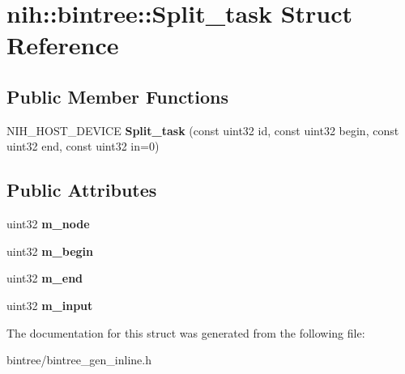 \hypertarget{structnih_1_1bintree_1_1_split__task}{
\section{nih\-:\-:bintree\-:\-:\-Split\-\_\-task \-Struct \-Reference}
\label{structnih_1_1bintree_1_1_split__task}
}
\subsection*{\-Public \-Member \-Functions}
\begin{DoxyCompactItemize}
\item 
\hypertarget{structnih_1_1bintree_1_1_split__task_a6b8703608b459fcbc0af077901c25b6a}{
\-N\-I\-H\-\_\-\-H\-O\-S\-T\-\_\-\-D\-E\-V\-I\-C\-E {\bfseries \-Split\-\_\-task} (const uint32 id, const uint32 begin, const uint32 end, const uint32 in=0)}
\label{structnih_1_1bintree_1_1_split__task_a6b8703608b459fcbc0af077901c25b6a}

\end{DoxyCompactItemize}
\subsection*{\-Public \-Attributes}
\begin{DoxyCompactItemize}
\item 
\hypertarget{structnih_1_1bintree_1_1_split__task_aee4a7c2251650f82d4c9492012c41477}{
uint32 {\bfseries m\-\_\-node}}
\label{structnih_1_1bintree_1_1_split__task_aee4a7c2251650f82d4c9492012c41477}

\item 
\hypertarget{structnih_1_1bintree_1_1_split__task_afa16e63fc29dabf61b3cb6e53fa4a000}{
uint32 {\bfseries m\-\_\-begin}}
\label{structnih_1_1bintree_1_1_split__task_afa16e63fc29dabf61b3cb6e53fa4a000}

\item 
\hypertarget{structnih_1_1bintree_1_1_split__task_aa8a14d7476151677f01ec3703d1862bc}{
uint32 {\bfseries m\-\_\-end}}
\label{structnih_1_1bintree_1_1_split__task_aa8a14d7476151677f01ec3703d1862bc}

\item 
\hypertarget{structnih_1_1bintree_1_1_split__task_a5889b6f707b78ff9b306738352078251}{
uint32 {\bfseries m\-\_\-input}}
\label{structnih_1_1bintree_1_1_split__task_a5889b6f707b78ff9b306738352078251}

\end{DoxyCompactItemize}


\-The documentation for this struct was generated from the following file\-:\begin{DoxyCompactItemize}
\item 
bintree/bintree\-\_\-gen\-\_\-inline.\-h\end{DoxyCompactItemize}
